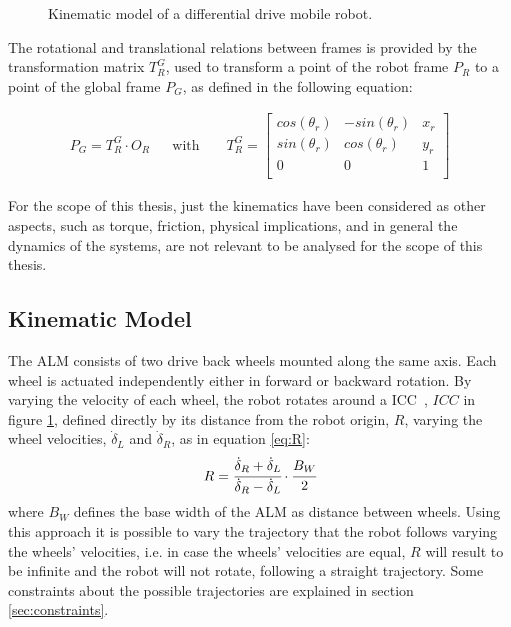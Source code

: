\begin{figure}[!ht]
  \caption{Kinematic model of a differential drive mobile robot.}
  \label{fig:TikzKine}
\end{figure}

The rotational and translational relations between frames is provided by the transformation matrix $T^G_R$, used to transform a point of the robot frame $P_R$ to a point of the global frame $P_G$, as defined in the following equation:

\begin{align}
P_{G} = T^G_R \cdot O_{R} && \text{with } && T^G_R =
\begin{bmatrix}
cos(\theta_r) & -sin(\theta_r) & x_r \\
sin(\theta_r) & cos(\theta_r) & y_r \\
0 & 0 & 1 \\
\end{bmatrix}
\label{eq:transfPoint}
\end{align}

For the scope of this thesis, just the kinematics have been considered as other aspects, such as torque, friction, physical implications, and in general the dynamics of the systems, are not relevant to be analysed for the scope of this thesis.

\subsection{Kinematic Model}

\noindent
The \gls{ALM} consists of two drive back wheels mounted along the same axis.
Each wheel is actuated independently either in forward or backward rotation.
By varying the velocity of each wheel, the robot rotates around a \gls{ICC}~\cite{ICC}, $ICC$ in figure \ref{fig:TikzKine}, defined directly by its distance from the robot origin, $R$, varying the wheel velocities, $\dot \delta_L$ and $\dot \delta_R$, as in equation \eqref{eq:R}:
\begin{equation}
    R = \cfrac{\dot \delta_R + \dot \delta_L}{\dot \delta_R - \dot \delta_L} \cdot \cfrac{B_W}{2}
    \label{eq:R}
\end{equation}
where $B_W$ defines the base width of the \gls{ALM} as distance between wheels.
Using this approach it is possible to vary the trajectory that the robot follows varying the wheels' velocities, i.e. in case the wheels' velocities are equal, $R$ will result to be infinite and the robot will not rotate, following a straight trajectory.
Some constraints about the possible trajectories are explained in section \ref{sec:constraints}.

